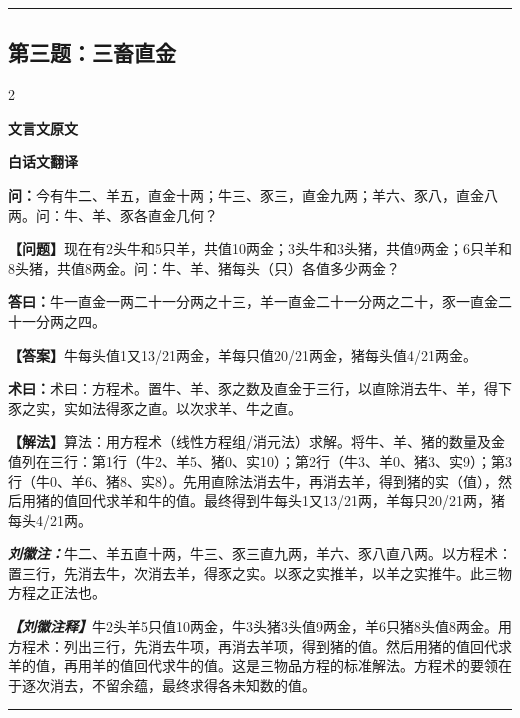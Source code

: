 \documentclass[10pt,a4paper]{article}
\newcommand{\wen}[1]{\textbf{\color{problemcolor}问：}#1\par}
\newcommand{\da}[1]{\textbf{答曰：}#1\par}
\newcommand{\shu}[1]{\textbf{术曰：}#1\par}
\newcommand{\liuhui}[1]{{\color{commentarycolor}\textit{\textbf{刘徽注：}}#1\par}}
\newcommand{\classicalheader}[1]{{\centering\large\bfseries\color{classicalcolor} #1\par\vspace{0.5em}}}
\newcommand{\wenmodern}[1]{\textbf{\color{moderncolor}【问题】}#1\par}
\newcommand{\damodern}[1]{\textbf{【答案】}#1\par}
\newcommand{\shumodern}[1]{\textbf{【解法】}#1\par}
\newcommand{\liuhuimodern}[1]{{\color{commentarycolor}\textit{\textbf{【刘徽注释】}}#1\par}}
\newcommand{\modernheader}[1]{{\centering\large\bfseries\color{moderncolor} #1\par\vspace{0.5em}}}
\newcommand{\problemsec}[1]{\subsection*{#1}}
\begin{document}
\vspace{0.3cm}
\hrule
\vspace{0.3cm}

\problemsec{第三题：三畜直金}
\begin{paracol}{2}
\classicalheader{文言文原文}
\switchcolumn
\modernheader{白话文翻译}
\switchcolumn*

\wen{今有牛二、羊五，直金十两；牛三、豕三，直金九两；羊六、豕八，直金八两。问：牛、羊、豕各直金几何？}

\switchcolumn

\wenmodern{现在有2头牛和5只羊，共值10两金；3头牛和3头猪，共值9两金；6只羊和8头猪，共值8两金。问：牛、羊、猪每头（只）各值多少两金？}

\switchcolumn*

\da{牛一直金一两二十一分两之十三，羊一直金二十一分两之二十，豕一直金二十一分两之四。}

\switchcolumn

\damodern{牛每头值1又13/21两金，羊每只值20/21两金，猪每头值4/21两金。}

\switchcolumn*

\shu{术曰：方程术。置牛、羊、豕之数及直金于三行，以直除消去牛、羊，得下豕之实，实如法得豕之直。以次求羊、牛之直。}

\switchcolumn

\shumodern{算法：用方程术（线性方程组/消元法）求解。将牛、羊、猪的数量及金值列在三行：第1行（牛2、羊5、猪0、实10）；第2行（牛3、羊0、猪3、实9）；第3行（牛0、羊6、猪8、实8）。先用直除法消去牛，再消去羊，得到猪的实（值），然后用猪的值回代求羊和牛的值。最终得到牛每头1又13/21两，羊每只20/21两，猪每头4/21两。}

\switchcolumn*

\liuhui{牛二、羊五直十两，牛三、豕三直九两，羊六、豕八直八两。以方程术：置三行，先消去牛，次消去羊，得豕之实。以豕之实推羊，以羊之实推牛。此三物方程之正法也。}

\switchcolumn

\liuhuimodern{牛2头羊5只值10两金，牛3头猪3头值9两金，羊6只猪8头值8两金。用方程术：列出三行，先消去牛项，再消去羊项，得到猪的值。然后用猪的值回代求羊的值，再用羊的值回代求牛的值。这是三物品方程的标准解法。方程术的要领在于逐次消去，不留余蕴，最终求得各未知数的值。}

\end{paracol}

\vspace{0.3cm}
\hrule
\vspace{0.3cm}
\end{document}
